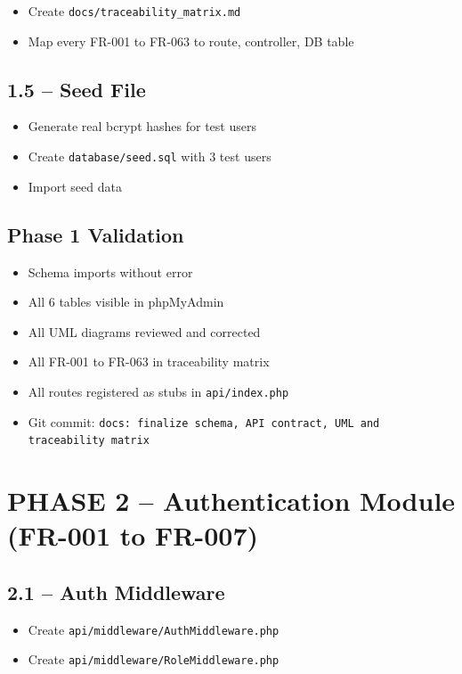 \documentclass[11pt,a4paper]{article}
\newcommand{\undone}{\textcolor{helixgray}{\texttt{[ ] }}}
\newcommand{\filepath}[1]{\texttt{\small#1}}
\newcommand{\task}[2]{\item[#1] #2}
\begin{document}
\begin{itemize}
    \task{\undone}{Create \filepath{docs/traceability\_matrix.md}}
    \task{\undone}{Map every FR-001 to FR-063 to route, controller, DB table}
\end{itemize}

\subsection{1.5 -- Seed File}

\begin{itemize}
    \task{\undone}{Generate real bcrypt hashes for test users}
    \task{\undone}{Create \filepath{database/seed.sql} with 3 test users}
    \task{\undone}{Import seed data}
\end{itemize}

\subsection{Phase 1 Validation}

\begin{itemize}
    \task{\undone}{Schema imports without error}
    \task{\undone}{All 6 tables visible in phpMyAdmin}
    \task{\undone}{All UML diagrams reviewed and corrected}
    \task{\undone}{All FR-001 to FR-063 in traceability matrix}
    \task{\undone}{All routes registered as stubs in \filepath{api/index.php}}
    \task{\undone}{Git commit: \texttt{docs: finalize schema, API contract, UML and traceability matrix}}
\end{itemize}

\section{PHASE 2 -- Authentication Module (FR-001 to FR-007)}

\subsection{2.1 -- Auth Middleware}

\begin{itemize}
    \task{\undone}{Create \filepath{api/middleware/AuthMiddleware.php}}
    \task{\undone}{Create \filepath{api/middleware/RoleMiddleware.php}}
\end{itemize}
\end{document}
